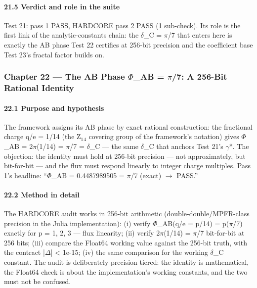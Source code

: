 \documentclass[10pt]{article}
\begin{document}
\paragraph{21.5 Verdict and role in the suite}

Test 21: pass 1 PASS, HARDCORE pass 2 PASS (1 sub-check). Its role is the first link of the analytic-constants chain: the $\delta$\_C = $\pi$/7 that enters here is exactly the AB phase Test 22 certifies at 256-bit precision and the coefficient base Test 23's fractal factor builds on.

\subsubsection{Chapter 22 --- The AB Phase $\Phi$\_AB = $\pi$/7: A 256-Bit Rational Identity}

\paragraph{22.1 Purpose and hypothesis}

The framework assigns its AB phase by exact rational construction: the fractional charge q/e = 1/14 (the Z$_1$$_4$ covering group of the framework's notation) gives $\Phi$\_AB = 2$\pi$\textperiodcentered{}(1/14) = $\pi$/7 = $\delta$\_C --- the same $\delta$\_C that anchors Test 21's $\gamma$*. The objection: the identity must hold at 256-bit precision --- not approximately, but bit-for-bit --- and the flux must respond linearly to integer charge multiples. Pass 1's headline: ``$\Phi$\_AB = 0.4487989505 = $\pi$/7 (exact) $\rightarrow$ PASS.''

\paragraph{22.2 Method in detail}

The HARDCORE audit works in 256-bit arithmetic (double-double/MPFR-class precision in the Julia implementation): (i) verify $\Phi$\_AB(q/e = p/14) = p\textperiodcentered{}($\pi$/7) exactly for p = 1, 2, 3 --- flux linearity; (ii) verify 2$\pi$\textperiodcentered{}(1/14) = $\pi$/7 bit-for-bit at 256 bits; (iii) compare the Float64 working value against the 256-bit truth, with the contract |$\Delta$| < 1e-15; (iv) the same comparison for the working $\delta$\_C constant. The audit is deliberately precision-tiered: the identity is mathematical, the Float64 check is about the implementation's working constants, and the two must not be confused.
\end{document}

